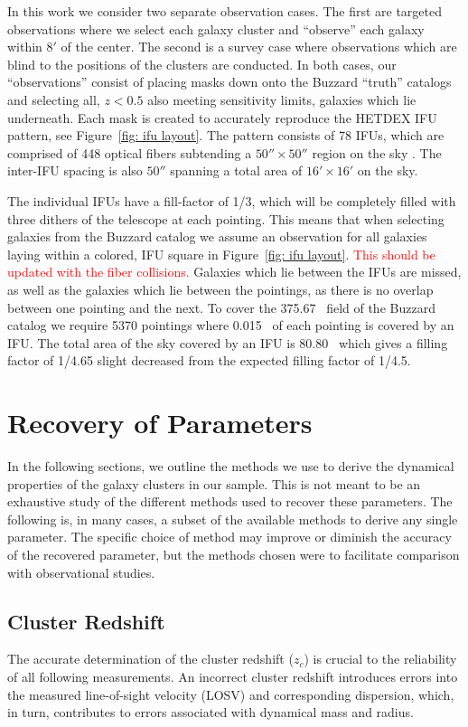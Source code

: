 \documentclass[apj, revtex4]{emulateapj}
\newcommand{\editorial}[1]{\textcolor{red}{#1}}
\begin{document}
In this work we consider two separate observation cases. The first are targeted observations where we select each galaxy cluster and ``observe'' each galaxy within $8'$ of the center. The second is a survey case where observations which are blind to the positions of the clusters are conducted. In both cases, our ``observations'' consist of placing masks down onto the Buzzard ``truth'' catalogs and selecting all, $z< 0.5$ also meeting sensitivity limits, galaxies which lie underneath. Each mask is created to accurately reproduce the HETDEX IFU pattern, see Figure~\ref{fig: ifu layout}. The pattern consists of 78 IFUs, which are comprised of 448 optical fibers subtending a $50'' \times 50''$ region on the sky \citep{Kelz2014}. The inter-IFU spacing is also $50''$ spanning a total area of $16'\times 16'$ on the sky. 

The individual IFUs have a fill-factor of 1/3, which will be completely filled with three dithers of the telescope at each pointing. This means that when selecting galaxies from the Buzzard catalog we assume an observation for all galaxies laying within a colored, IFU square in Figure~\ref{fig: ifu layout}. \editorial{This should be updated with the fiber collisions.} Galaxies which lie between the IFUs are missed, as well as the galaxies which lie between the pointings, as there is no overlap between one pointing and the next. To cover the 375.67 \degsq\ field of the Buzzard catalog we require 5370 pointings where 0.015 \degsq\ of each pointing is covered by an IFU. The total area of the sky covered by an IFU is 80.80 \degsq\ which gives a filling factor of 1/4.65 slight decreased from the expected filling factor of 1/4.5. 

\section{Recovery of Parameters}\label{sec: recovery}
 In the following sections, we outline the methods we use to derive the dynamical properties of the galaxy clusters in our sample. This is not meant to be an exhaustive study of the different methods used to recover these parameters. The following is, in many cases, a subset of the available methods to derive any single parameter. The specific choice of method may improve or diminish the accuracy of the recovered parameter, but the methods chosen were to facilitate comparison with observational studies. 

\subsection{Cluster Redshift}
The accurate determination of the cluster redshift ($z_c$) is crucial to the reliability of all following measurements. An incorrect cluster redshift introduces errors into the measured line-of-sight velocity (LOSV) and corresponding dispersion, which, in turn, contributes to errors associated with dynamical mass and radius. 
\end{document}
